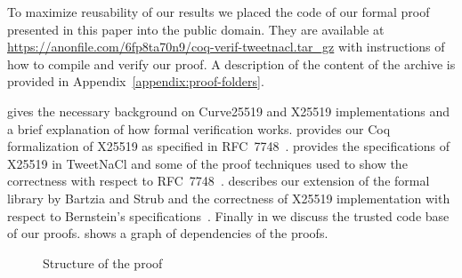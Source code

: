 

To maximize reusability of our results we placed the code of our formal proof
presented in this paper into the public domain.
They are available at \url{https://anonfile.com/6fp8ta70n9/coq-verif-tweetnacl.tar_gz}
with instructions of how to compile and verify our proof.
A description of the content of the archive is provided in
Appendix~\ref{appendix:proof-folders}.

 gives the necessary background on Curve25519 and X25519
implementations and a brief explanation of how formal verification works.
 provides our Coq formalization of X25519 as specified in RFC~7748~\cite{rfc7748}.
 provides the specifications of X25519 in TweetNaCl and some of the
proof techniques used to show the correctness with respect to RFC~7748~\cite{rfc7748}.
 describes our extension of the formal library by Bartzia
and Strub and the correctness of X25519 implementation with respect to Bernstein's
specifications~\cite{Ber14}.
Finally in  we discuss the trusted code base of our proofs.
 shows a graph of dependencies of the proofs.

\begin{figure}[h]
  \centering
  
  \caption{Structure of the proof}
  \label{tikz:ProofOverview}
\end{figure}



